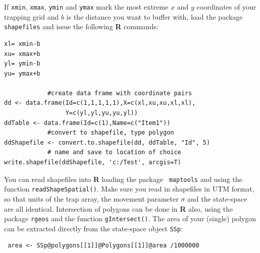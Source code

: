 If \mbox{\tt xmin}, \mbox{\tt xmax}, \mbox{\tt ymin} and
\mbox{\tt ymax} mark the most extreme
$x$ and $y$ coordinates of your
trapping grid and $b$ is the distance you want to buffer with, load the
package \mbox{\tt shapefiles} \citep{stabler:2006} and issue the following
{\bf R} commands:
\begin{verbatim}
xl= xmin-b
xu= xmax+b
yl= ymin-b
yu= ymax+b

            #create data frame with coordinate pairs
dd <- data.frame(Id=c(1,1,1,1,1),X=c(xl,xu,xu,xl,xl),
				 Y=c(yl,yl,yu,yu,yl))
ddTable <- data.frame(Id=c(1),Name=c("Item1"))
            #convert to shapefile, type polygon
ddShapefile <- convert.to.shapefile(dd, ddTable, "Id", 5)
            # name and save to location of choice
write.shapefile(ddShapefile, 'c:/Test', arcgis=T)
\end{verbatim}

You can read shapefiles into {\bf R} loading the package \mbox{\tt
maptools}
\citep{lewin-koh_etal:2011} and using the function
\verb#readShapeSpatial()#. Make sure you read in shapefiles in UTM format, so
that units of the trap array, the movement parameter $\sigma$ and the
state-space are all identical.
Intersection of polygons can be done
in {\bf R} also, using the package \mbox{\tt rgeos}
\citep{bivand_rundel:2011} and the
function \verb#gIntersect()#.
The area of your (single) polygon can be
extracted directly from the state-space object \mbox{\tt SSp}:

\begin{verbatim}
 area <- SSp@polygons[[1]]@Polygons[[1]]@area /1000000
\end{verbatim}


